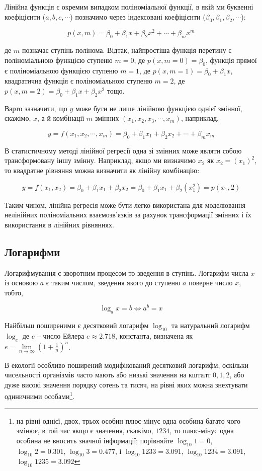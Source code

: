 \documentclass[
  11pt,
]{book}
\begin{document}
Лінійна функція є окремим випадком поліноміальної функції, в якій ми буквенні коефіцієнти (\(a, b, c, \cdots\)) позначимо через індексовані коефіцієнти (\(\beta_0, \beta_1, \beta_2, \cdots\)):

\[p(x, m) = \beta_0 + \beta_1 x + \beta_2 x^2 + \cdots + \beta_m x^m\]

де \(m\) позначає ступінь полінома. Відтак, найпростіша функція перетину є поліноміальною функцією ступеню \(m = 0\), де \(p(x, m = 0) = \beta_0\), функція прямої є поліноміальною функцією ступеню \(m = 1\), де \(p(x, m = 1) = \beta_0 + \beta_1 x\), квадратична функція є поліноміальною ступеню \(m = 2\), де \(p(x, m = 2) = \beta_0 + \beta_1 x + \beta_2 x^2\) тощо.

Варто зазначити, що \(y\) може бути не лише лінійною функцією однієї змінної, скажімо, \(x\), а й комбінації \(m\) змінних \((x_1, x_2, x_3, \cdots, x_m)\), наприклад,

\[y = f(x_1, x_2, \cdots, x_m) = \beta_0 + \beta_1 x_1 + \beta_2 x_2 + \cdots + \beta_m x_m\]

В статистичному методі лінійної регресії одна зі змінних може являти собою трансформовану іншу змінну. Наприклад, якщо ми визначимо \(x_2\) як \(x_2 = (x_1)^2\), то квадратне рівняння можна визначити як лінійну комбінацію:

\[y = f(x_1, x_2) = \beta_0 + \beta_1 x_1 + \beta_2 x_2 = \beta_0 + \beta_1 x_1 + \beta_2 (x_1^2) = p(x_1, 2)\]

Таким чином, лінійна регресія може бути легко використана для моделювання нелінійних поліноміальних взаємозв'язків за рахунок трансформації змінних і їх використання в лінійних рівняннях.

\subsection{Логарифми}\label{logs}

Логарифмування є зворотним процесом то зведення в ступінь. Логарифм числа \(x\) із основою \(a\) є таким числом, зведення якого до ступеню \(a\) поверне число \(x\), тобто,

\[\log_a x = b\iff a^b = x\]

Найбільш поширеними є десятковий логарифм \(\log_{10}\) та натуральний логарифм \(\log_e\) де \(e\) -- число Ейлера \(e \approx 2.718\), константа, визначена як \(e = \lim\limits_{n \rightarrow \infty} (1 + \frac{1}{n})^n\).

В екології особливо поширений модифікований десятковий логарифм, оскільки чисельності організмів часто мають або низькі значення на кшталт \(0, 1, 2\), або дуже високі значення порядку сотень та тисяч, на рівні яких можна знехтувати одиничними особами\footnote{на рівні однієї, двох, трьох особин плюс-мінус одна особина багато чого змінює, в той час якщо є значення, скажімо, \(1234\), то плюс-мінус одна особина не вносить значної інформації; порівняйте \(\log_{10} 1 = 0\), \(\log_{10} 2 = 0.301\), \(\log_{10} 3 = 0.477\), і \(\log_{10} 1233 = 3.091\), \(\log_{10} 1234 = 3.091\), \(\log_{10} 1235 = 3.092\)}.
\end{document}
